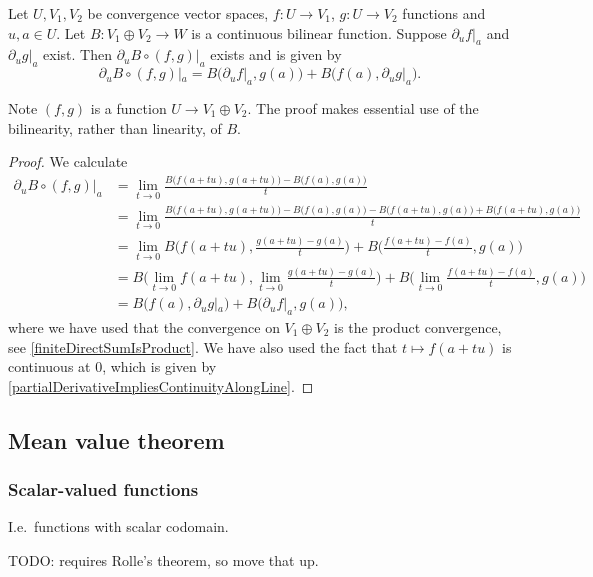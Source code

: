 \begin{proposition} \label{LeibnizDerivativeRule}
Let $U,V_1,V_2$ be convergence vector spaces, $f: U\to V_1$, $g: U\to V_2$ functions and $u,a\in U$. Let $B: V_1\oplus V_2 \to W$ is a continuous bilinear function. Suppose $\partial_uf|_a$ and $\partial_ug|_a$ exist. Then $\partial_u B\circ (f,g)|_a$ exists and is given by
\[ \partial_u B\circ (f,g)|_a = B\big(\partial_uf|_a, g(a)\big) + B\big(f(a), \partial_ug|_a\big). \]
\end{proposition}
Note $(f,g)$ is a function $U\to V_1\oplus V_2$. The proof makes essential use of the bilinearity, rather than linearity, of $B$.
\begin{proof}
We calculate
\begin{align*}
\partial_u B\circ (f,g)|_a &= \lim_{t\to 0} \frac{B\big(f(a+tu), g(a+tu)\big) - B\big(f(a), g(a)\big)}{t} \\
&= \lim_{t\to 0} \frac{B\big(f(a+tu), g(a+tu)\big) - B\big(f(a), g(a)\big) - B\big(f(a+tu), g(a)\big) + B\big(f(a+tu), g(a)\big)}{t} \\
&= \lim_{t\to 0} B\Big(f(a+tu), \frac{g(a+tu)-g(a)}{t}\Big) + B\Big(\frac{f(a+tu) - f(a)}{t}, g(a)\Big) \\
&= B\Big(\lim_{t\to 0}f(a+tu), \lim_{t\to 0}\frac{g(a+tu)-g(a)}{t}\Big) + B\Big(\lim_{t\to 0}\frac{f(a+tu) - f(a)}{t}, g(a)\Big) \\
&= B\Big(f(a), \partial_ug|_a\Big) + B\Big(\partial_uf|_a, g(a)\Big),
\end{align*}
where we have used that the convergence on $V_1\oplus V_2$ is the product convergence, see \ref{finiteDirectSumIsProduct}. We have also used the fact that $t\mapsto f(a+tu)$ is continuous at $0$, which is given by \ref{partialDerivativeImpliesContinuityAlongLine}.
\end{proof}


\subsection{Mean value theorem}
\subsubsection{Scalar-valued functions}
I.e.\ functions with scalar codomain.


TODO: requires Rolle's theorem, so move that up.

